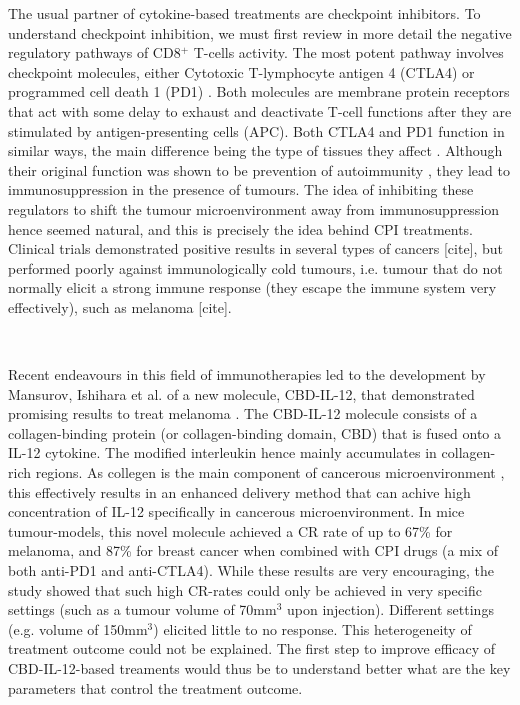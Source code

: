 \documentclass[11pt]{article}
\begin{document}
%
\par The usual partner of cytokine-based treatments are checkpoint inhibitors. To understand checkpoint inhibition, we must first review in more detail the negative regulatory pathways of CD8$^+$ T-cells activity. The most potent pathway involves checkpoint molecules, either Cytotoxic T-lymphocyte antigen 4 (CTLA4) or programmed cell death 1 (PD1) \cite{cpiProof}. Both molecules are membrane protein receptors that act with some delay to exhaust and deactivate T-cell functions after they are stimulated by antigen-presenting cells (APC). Both CTLA4 and PD1 function in similar ways, the main difference being the type of tissues they affect \cite{PDvsCTLA}. Although their original function was shown to be prevention of autoimmunity \cite{PD1Autoimmune}, they lead to immunosuppression in the presence of tumours. The idea of inhibiting these regulators to shift the tumour microenvironment away from immunosuppression hence seemed natural, and this is precisely the idea behind CPI treatments. Clinical trials demonstrated positive results in several types of cancers [cite], but performed poorly against immunologically cold tumours, i.e. tumour that do not normally elicit a strong immune response (they escape the immune system very effectively), such as melanoma [cite].  

~ %
\par Recent endeavours in this field of immunotherapies led to the development by Mansurov, Ishihara et al. of a new molecule, CBD-IL-12, that demonstrated promising results to treat melanoma \cite{cbdil12}. The CBD-IL-12  molecule consists of a collagen-binding protein (or collagen-binding domain, CBD) that is fused onto a IL-12 cytokine. The modified interleukin hence mainly accumulates in collagen-rich regions. As collegen is the main component of cancerous microenvironment \cite{collagenInCancer}, this effectively results in an enhanced delivery method that can achive high concentration of IL-12 specifically in cancerous microenvironment. In mice tumour-models, this novel molecule achieved a CR rate of up to 67\% for melanoma, and 87\% for breast cancer when combined with CPI drugs (a mix of both anti-PD1 and anti-CTLA4). While these results are very encouraging, the study showed that such high CR-rates could only be achieved in very specific settings (such as a tumour volume of 70mm$^3$ upon injection). Different settings (e.g. volume of 150mm$^3$) elicited little to no response. This heterogeneity of treatment outcome could not be explained. The first step to improve efficacy of CBD-IL-12-based treaments would thus be to understand better what are the key parameters that control the treatment outcome. 
\end{document}
